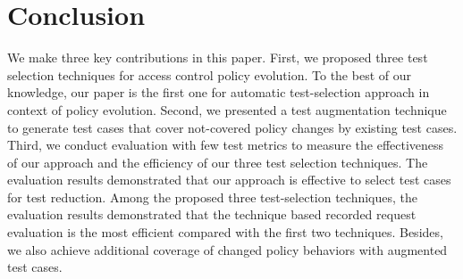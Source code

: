 \section{Conclusion}
\label{sec:conclusion}

We make three key contributions in this paper. First, we proposed three test selection techniques for access control policy evolution. 
To the best of our knowledge, our paper is the first one for automatic test-selection approach in context of policy
evolution. Second, we presented a test augmentation technique to generate test cases that cover not-covered
policy changes by existing test cases. Third, we conduct evaluation with few test metrics to measure the effectiveness of our approach and the efficiency of our three test selection
techniques.
The evaluation results demonstrated that our approach is effective to select test cases for test reduction.
Among the proposed three test-selection techniques, the evaluation results demonstrated that the technique based recorded
request evaluation is the most efficient compared with the first two techniques. Besides, we also achieve additional coverage
of changed policy behaviors with augmented test cases.

%
%
%
%
%
%
